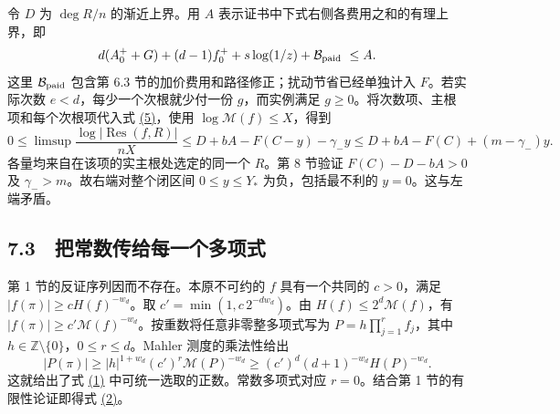 \documentclass[11pt,a4paper]{article}
\begin{document}
令 \(D\) 为 \(\deg R/n\) 的渐近上界。用 \(A\) 表示证书中下式右侧各费用之和的有理上界，即
\[
 d(A_0^+ +G)+(d-1)f_0^+ +s\log(1/z)+\mathcal B_{\rm paid}\ \le A .
\]
这里 \(\mathcal B_{\rm paid}\) 包含第 6.3 节的加价费用和路径修正；扰动节省已经单独计入 \(F\)。若实际次数 \(e<d\)，每少一个次根就少付一份 \(g\)，而实例满足 \(g\ge0\)。将次数项、主根项和每个次根项代入式 \hyperref[eq:5]{(5)}，使用 \(\log\mathcal M(f)\le X\)，得到
\[
 0\le\limsup\frac{\log|\operatorname{Res}(f,R)|}{nX}
 \le D+bA-F(C-y)-\gamma_- y
 \le D+bA-F(C)+(m-\gamma_-)y . \tag{25}\label{eq:25}
\]
各量均来自在该项的实主根处选定的同一个 \(R\)。第 8 节验证 \(F(C)-D-bA>0\) 及 \(\gamma_- > m\)。故右端对整个闭区间 \(0\le y\le Y_*\) 为负，包括最不利的 \(y=0\)。这与左端矛盾。

\subsection{7.3　把常数传给每一个多项式}
第 1 节的反证序列因而不存在。本原不可约的 \(f\) 具有一个共同的 \(c>0\)，满足 \(|f(\pi)|\ge cH(f)^{-w_d}\)。取 \(c'=\min(1,c\,2^{-dw_d})\)。由 \(H(f)\le 2^d\mathcal M(f)\)，有 \(|f(\pi)|\ge c'\mathcal M(f)^{-w_d}\)。按重数将任意非零整多项式写为 \(P=h\prod_{j=1}^r f_j\)，其中 \(h\in\mathbb Z\setminus\{0\}\)，\(0\le r\le d\)。Mahler 测度的乘法性给出
\[
 |P(\pi)|\ge |h|^{1+w_d}(c')^r\mathcal M(P)^{-w_d}
 \ge (c')^d(d+1)^{-w_d} H(P)^{-w_d}.
\]
这就给出了式 \hyperref[eq:1]{(1)} 中可统一选取的正数。常数多项式对应 \(r=0\)。结合第 1 节的有限性论证即得式 \hyperref[eq:2]{(2)}。

\end{document}
